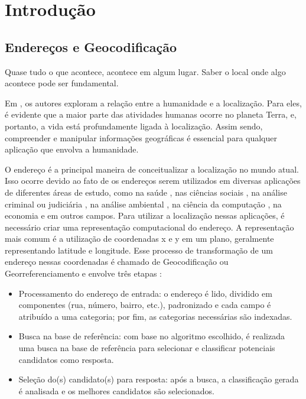 \chapter{Introdução} \label{Introducao}

\section{Endereços e Geocodificação}
 
\epigraph{Quase tudo o que acontece, acontece em algum lugar. Saber o local onde algo acontece pode ser fundamental.}{\cite{longley2013}}

Em \cite{longley2013}, os autores exploram a relação entre a humanidade e a localização. Para eles, é evidente que a maior parte das atividades humanas ocorre no planeta Terra, e, portanto, a vida está profundamente ligada à localização. Assim sendo, compreender e manipular informações geográficas é essencial para qualquer aplicação que envolva a humanidade. 

O endereço é a principal maneira de conceitualizar a localização no mundo atual\cite{Zamberg2009}. Isso ocorre devido ao fato de os endereços serem utilizados em diversas aplicações de diferentes áreas de estudo, como na saúde \cite{AmericaJournal2001, Kypri2009, Mazumdar2008}, nas ciências sociais \cite{Chow2011}, na análise criminal ou judiciária \cite{Olligschlaeger1998}, na análise ambiental \cite{Gilboa2006}, na ciência da computação \cite{Zamberg2009}, na economia \cite{Whitsel2006} e em outros campos. Para utilizar a localização nessas aplicações, é necessário criar uma representação computacional do endereço. A representação mais comum é a utilização de coordenadas x e y em um plano, geralmente representando latitude e longitude. Esse processo de transformação de um endereço nessas coordenadas é chamado de Geocodificação ou Georreferenciamento e envolve três etapas \cite{Zamberg2009}:

\begin{itemize}
   \item Processamento do endereço de entrada: o endereço é lido, dividido em componentes (rua, número, bairro, etc.), padronizado e cada campo é atribuído a uma categoria; por fim, as categorias necessárias são indexadas.
   \item Busca na base de referência: com base no algoritmo escolhido, é realizada uma busca na base de referência para selecionar e classificar potenciais candidatos como resposta.
   \item Seleção do(s) candidato(s) para resposta: após a busca, a classificação gerada é analisada e os melhores candidatos são selecionados.
\end{itemize}


